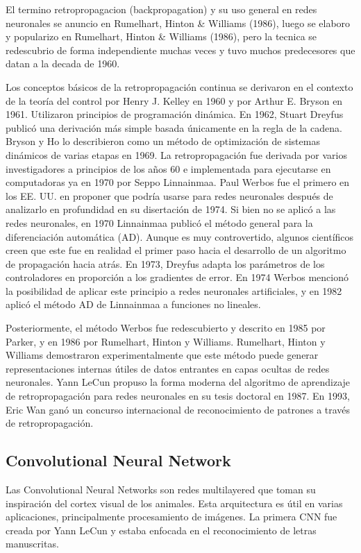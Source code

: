 \documentclass[a4paper]{article}
\begin{document}
El termino retropropagacion (backpropagation) y su uso general en redes neuronales
 se anuncio en Rumelhart, Hinton
  \& Williams (1986), luego se elaboro y popularizo en Rumelhart, 
Hinton \& Williams (1986), pero la tecnica se redescubrio de forma independiente muchas veces y tuvo muchos predecesores que datan a la decada de 1960.

Los conceptos básicos de la retropropagación continua se derivaron en el contexto de la teoría del control por Henry J. Kelley en 1960 y por Arthur E. Bryson en 1961. Utilizaron principios de programación dinámica. En 1962, Stuart Dreyfus publicó una derivación más simple basada únicamente en la regla de la cadena. Bryson y Ho lo describieron como un método de optimización de sistemas dinámicos de varias etapas en 1969. La retropropagación fue derivada por varios investigadores a principios de los años 60 e implementada para ejecutarse en computadoras ya en 1970 por Seppo Linnainmaa. Paul Werbos fue el primero en los EE. UU. en proponer que podría usarse para redes neuronales después de analizarlo en profundidad en su disertación de 1974. Si bien no se aplicó a las redes neuronales, en 1970 Linnainmaa publicó el método general para la diferenciación automática (AD). Aunque es muy controvertido, algunos científicos creen que este fue en realidad el primer paso hacia el desarrollo de un algoritmo de propagación hacia atrás. En 1973, Dreyfus adapta los parámetros de los controladores en proporción a los gradientes de error. En 1974 Werbos mencionó la posibilidad de aplicar este principio a redes neuronales artificiales, y en 1982 aplicó el método AD de Linnainmaa a funciones no lineales.

Posteriormente, el método Werbos fue redescubierto y descrito en 1985 por Parker, y en 1986 por Rumelhart, Hinton y Williams. Rumelhart, Hinton y Williams demostraron experimentalmente que este método puede generar representaciones internas útiles de datos entrantes en capas ocultas de redes neuronales. Yann LeCun propuso la forma moderna del algoritmo de aprendizaje de retropropagación para redes neuronales en su tesis doctoral en 1987. En 1993, Eric Wan ganó un concurso internacional de reconocimiento de patrones a través de retropropagación.

\subsection{Convolutional Neural Network}
Las Convolutional Neural Networks son redes multilayered que toman su inspiración del cortex visual de los animales. Esta arquitectura es útil en varias aplicaciones, principalmente procesamiento de imágenes. La primera CNN fue creada por Yann LeCun y estaba enfocada en el reconocimiento de letras manuscritas.
\end{document}
